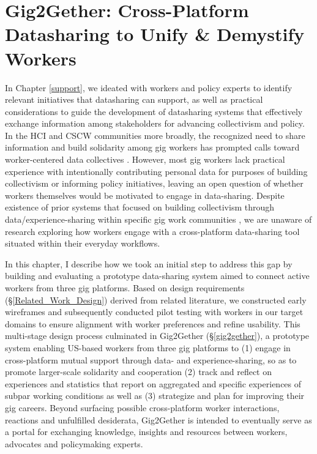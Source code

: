 \chapter{Gig2Gether: Cross-Platform Datasharing to Unify \& Demystify Workers} \label{6gig2gether}
In Chapter \ref{support}, we ideated with workers and policy experts to identify relevant initiatives that datasharing can support, as well as practical considerations to guide the development of datasharing systems that effectively exchange information among stakeholders for advancing collectivism and policy.
In the HCI and CSCW communities more broadly, the recognized need to share information and build solidarity among gig workers has prompted calls toward worker-centered data collectives \cite{supporting, workshop, end, uuapp, sousveillance}. 
However, most gig workers lack practical experience with intentionally contributing personal data for purposes of building collectivism or informing policy initiatives, leaving an open question of whether workers themselves would be motivated to engage in data-sharing. Despite existence of prior systems that focused on building collectivism through data/experience-sharing within specific gig work communities \cite{dynamo, 6B4U}, we are unaware of research exploring how workers engage with a cross-platform data-sharing tool situated within their everyday workflows.

{In this chapter, I describe how we took an initial step to address this gap by building and evaluating a prototype data-sharing system aimed to connect active workers from three gig platforms.
Based on design requirements {(\S\ref{Related_Work_Design})} derived from related literature, we constructed early wireframes and subsequently
conducted pilot testing with workers in our target domains to ensure alignment with worker preferences and refine usability.}
{This multi-stage design process culminated in} Gig2Gether (\S\ref{gig2gether}), a {prototype} system {enabling} US-based workers {from three gig platforms} to (1) {engage in cross-platform mutual support through data- and experience-sharing, so as to promote larger-scale solidarity and cooperation} (2) track {and reflect on experiences and statistics that report on aggregated and specific experiences of subpar working conditions}
 as well as (3) {strategize and} plan {for improving their gig careers}. {Beyond} {surfacing possible cross-platform} worker {interactions, reactions and unfulfilled }desiderata, Gig2Gether is intended to eventually serve as a portal {for exchanging knowledge, insights and resources} between workers, advocates and policymaking experts.

